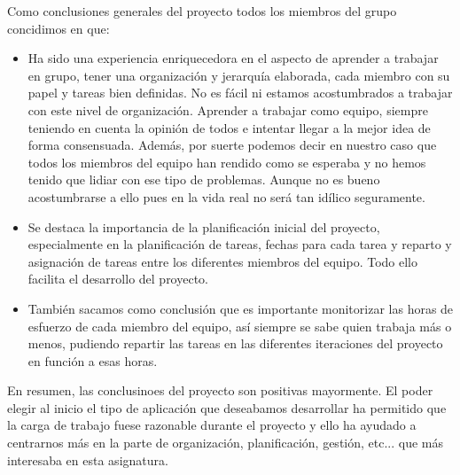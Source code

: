 Como conclusiones generales del proyecto todos los miembros del grupo concidimos en que:
\begin{itemize}
	\item  Ha sido una experiencia enriquecedora en el aspecto de aprender a trabajar en grupo, tener una organización y jerarquía elaborada, cada miembro con su papel y tareas bien definidas. No es fácil ni estamos acostumbrados a trabajar con este nivel de organización. Aprender a trabajar como equipo, siempre teniendo en cuenta la opinión de todos e intentar llegar a la mejor idea de forma consensuada. Además, por suerte podemos decir en nuestro caso que todos los miembros del equipo han rendido como se esperaba y no hemos tenido que lidiar con ese tipo de problemas. Aunque no es bueno acostumbrarse a ello pues en la vida real no será tan idílico seguramente.
	
	\item Se destaca la importancia de la planificación inicial del proyecto, especialmente en la planificación de tareas, fechas para cada tarea y reparto y asignación de tareas entre los diferentes miembros del equipo. Todo ello facilita el desarrollo del proyecto.
	
	\item También sacamos como conclusión que es importante monitorizar las horas de esfuerzo de cada miembro del equipo, así siempre se sabe quien trabaja más o menos, pudiendo repartir las tareas en las diferentes iteraciones del proyecto en función a esas horas.
\end{itemize}

En resumen, las conclusinoes del proyecto son positivas mayormente. El poder elegir al inicio el tipo de aplicación que deseabamos desarrollar ha permitido que la carga de trabajo fuese razonable durante el proyecto y ello ha ayudado a centrarnos más en la parte de organización, planificación, gestión, etc... que más interesaba en esta asignatura.
